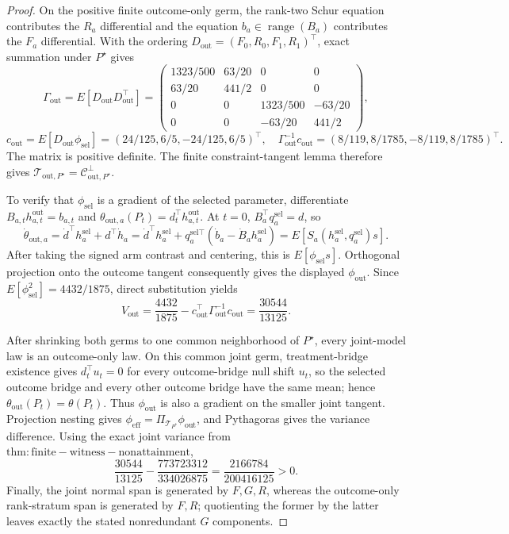 \documentclass{article}
\begin{document}
\begin{proof}
On the positive finite outcome-only germ, the rank-two Schur equation contributes the \(R_a\) differential and the equation \(b_a\in\operatorname{range}(B_a)\) contributes the \(F_a\) differential.  With the ordering \(D_{\mathrm{out}}=(F_0,R_0,F_1,R_1)^\top\), exact summation under \(P^\star\) gives
\[
\Gamma_{\mathrm{out}}=E[D_{\mathrm{out}}D_{\mathrm{out}}^\top]
=\begin{pmatrix}
1323/500&63/20&0&0\\
63/20&441/2&0&0\\
0&0&1323/500&-63/20\\
0&0&-63/20&441/2
\end{pmatrix},
\]
\[
c_{\mathrm{out}}=E[D_{\mathrm{out}}\phi_{\mathrm{sel}}]
=(24/125,6/5,-24/125,6/5)^\top,
\quad
\Gamma_{\mathrm{out}}^{-1}c_{\mathrm{out}}
=(8/119,8/1785,-8/119,8/1785)^\top.
\]
The matrix is positive definite.  The finite constraint-tangent lemma therefore gives
\(\mathcal T_{\mathrm{out},P^\star}=\mathcal C_{\mathrm{out},P^\star}^\perp\).

To verify that \(\phi_{\mathrm{sel}}\) is a gradient of the selected parameter, differentiate \(B_{a,t}h^{\mathrm{out}}_{a,t}=b_{a,t}\) and
\(\theta_{\mathrm{out},a}(P_t)=d_t^\top h^{\mathrm{out}}_{a,t}\).  At \(t=0\), \(B_a^\top q_a^{\mathrm{sel}}=d\), so
\[
\dot\theta_{\mathrm{out},a}
=\dot d^{\top}h_a^{\mathrm{sel}}+d^\top\dot h_a
=\dot d^{\top}h_a^{\mathrm{sel}}
+q_a^{\mathrm{sel}\top}(\dot b_a-\dot B_a h_a^{\mathrm{sel}})
=E[S_a(h_a^{\mathrm{sel}},q_a^{\mathrm{sel}})s].
\]
After taking the signed arm contrast and centering, this is \(E[\phi_{\mathrm{sel}}s]\).  Orthogonal projection onto the outcome tangent consequently gives the displayed \(\phi_{\mathrm{out}}\).  Since \(E[\phi_{\mathrm{sel}}^2]=4432/1875\), direct substitution yields
\[
V_{\mathrm{out}}=\frac{4432}{1875}-c_{\mathrm{out}}^\top
\Gamma_{\mathrm{out}}^{-1}c_{\mathrm{out}}
=\frac{30544}{13125}.
\]

After shrinking both germs to one common neighborhood of \(P^\star\), every joint-model law is an outcome-only law.  On this common joint germ, treatment-bridge existence gives \(d_t^\top u_t=0\) for every outcome-bridge null shift \(u_t\), so the selected outcome bridge and every other outcome bridge have the same mean; hence \(\theta_{\mathrm{out}}(P_t)=\theta(P_t)\).  Thus \(\phi_{\mathrm{out}}\) is also a gradient on the smaller joint tangent.  Projection nesting gives \(\phi_{\mathrm{eff}}=\Pi_{\mathcal T_{P^\star}}\phi_{\mathrm{out}}\), and Pythagoras gives the variance difference.  Using the exact joint variance from \(\mathrm{thm:finite-witness-nonattainment}\),
\[
\frac{30544}{13125}-\frac{773723312}{334026875}
=\frac{2166784}{200416125}>0.
\]
Finally, the joint normal span is generated by \(F,G,R\), whereas the outcome-only rank-stratum span is generated by \(F,R\); quotienting the former by the latter leaves exactly the stated nonredundant \(G\) components.
\end{proof}
\end{document}
